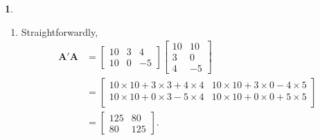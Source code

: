 \documentclass[10pt]{article}
\newtheorem{prob}{\bm{$Problem$}}
\begin{document}
\begin{prob}
\end{prob}
\begin{enumerate}[1)]
\vspace{3mm}

\item
Straightforwardly,
\begin{align*}
\pmb{A}'\pmb{A}&=
  \begin{bmatrix}
    10 & 3 & 4\\
    10 & 0 & -5
  \end{bmatrix}
  \begin{bmatrix}
    10 & 10\\
    3 & 0\\
    4 & -5
  \end{bmatrix}
\\
&=
  \begin{bmatrix}
    10\times10+3\times3+4\times4 & 10\times10+3\times0-4\times5\\
    10\times10+0\times3-5\times4 & 10\times10+0\times0+5\times5\\
  \end{bmatrix}
\\
&=
  \begin{bmatrix}
    125 & 80\\
    80 & 125
  \end{bmatrix}
.
\end{align*}


\end{enumerate}
\end{document}
